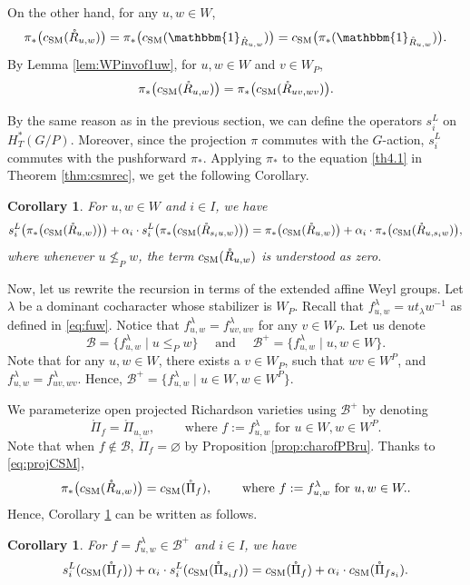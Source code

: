 \documentclass[12pt]{amsart}
\newtheorem{Coro}[Th]{Corollary}
\def\CSM{c_{\rm SM}}
\begin{document}
On the other hand, for any $u,w\in W$,
$$\pi_*\big(\CSM(\mathring{R}_{u,w})\big)
=\pi_*\big(\CSM(\mathbbm{1}_{\mathring{R}_{u,w}})\big)
=\CSM\big(\pi_*(\mathbbm{1}_{\mathring{R}_{u,w}})\big).$$
By Lemma \ref{lem:WPinvof1uw}, for $u,w\in W$ and $v\in W_P$,
\begin{equation}\label{eq:projCSM}
\pi_*\big(\CSM({\mathring{R}_{u,w}})\big)
=\pi_*\big(\CSM({\mathring{R}_{uv,wv}})\big).
\end{equation}


By the same reason as in the previous section, we can define the operators $s_i^L$ on $H_T^*(G/P)$. Moreover, since the projection $\pi$ commutes with the $G$-action, $s_i^L$ commutes with the pushforward $\pi_*$. Applying $\pi_*$ to the equation \eqref{th4.1} in Theorem \ref{thm:csmrec}, we get the following Corollary. 
\begin{Coro}\label{coro:projrecu}
For $u,w\in W$ and $i\in I$, we have
$$s_i^L\big(\pi_*\big(\CSM(\mathring{R}_{u,w})\big)\big)
+ \alpha_i\cdot s_i^L\big(\pi_*\big(\CSM(\mathring{R}_{s_iu,w})\big)\big)
= \pi_*\big(\CSM(\mathring{R}_{u,w})\big)
+ \alpha_i\cdot\pi_*\big(\CSM(\mathring{R}_{u,s_iw})\big),$$
where whenever $u\not\leq_P w$, the term $\CSM(\mathring{R}_{u,w})$ is understood as zero. 
\end{Coro}

Now, let us rewrite the recursion in terms of the extended affine Weyl groups. 
Let $\lambda$ be a dominant cocharacter whose stabilizer is $W_P$. Recall that $f^{\lambda}_{u,w}=ut_\lambda w^{-1}$ as defined in   \eqref{eq:fuw}. Notice that $f^{\lambda}_{u,w}=f^{\lambda}_{uv,wv}$ for any $v\in W_P$.
Let us denote 
\begin{equation}\label{eq:defofBandB+}
\mathcal{B}=\{f^{\lambda}_{u,w}\mid u\leq_P w\}\quad \text{ and }\quad
\mathcal{B}^+=\{f^{\lambda}_{u,w}\mid u,w\in W\}.
\end{equation}
Note that for any $u, w\in W$, there exists a $v\in W_P$, such that $wv\in W^P$, and $f^{\lambda}_{u,w}=f^{\lambda}_{uv,wv}$. Hence, $\mathcal{B}^+=\{f^{\lambda}_{u,w}\mid u\in W, w\in W^P\}$.

We parameterize open projected Richardson varieties using $\mathcal{B}^+$ by denoting
$$\mathring{\Pi}_f=\mathring{\Pi}_{u,w},\qquad \text{ where } f:=f^{\lambda}_{u,w} \text{ for } u\in W, w\in W^P.$$
Note that when $f\notin \mathcal{B}$, $\mathring{\Pi}_f=\varnothing$ by Proposition \ref{prop:charofPBru}. 
Thanks to  \eqref{eq:projCSM}, 
$$\pi_*\big(\CSM(\mathring{R}_{u,w})\big) =\CSM(\mathring{\Pi}_f),\qquad 
\text{ where } f:=f^{\lambda}_{u,w} \text{ for } u,w\in W..$$
Hence, Corollary \ref{coro:projrecu} can be written as follows.
\begin{Coro}\label{coro:recloc}
For $f=f^\lambda_{u,w}\in \mathcal{B}^+$ and $i\in I$, we have
\begin{align}\label{coro4.3}
s_i^L(\CSM(\mathring{\Pi}_{f}))
+ \alpha_i\cdot s_i^L(\CSM(\mathring{\Pi}_{s_if}))
= \CSM(\mathring{\Pi}_{f})
+ \alpha_i\cdot\CSM(\mathring{\Pi}_{fs_i}).
\end{align}
\end{Coro}
\end{document}
